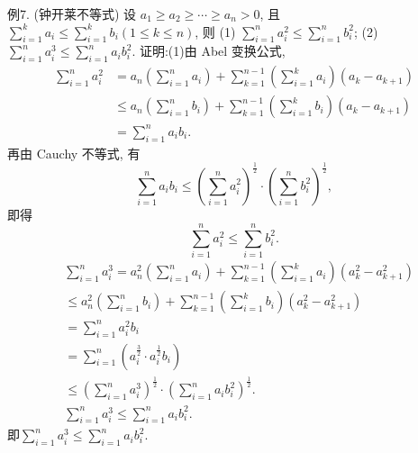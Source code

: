 例7. (钟开莱不等式) 设 $a_1 \geqslant a_2 \geqslant \cdots \geqslant a_n>0$, 且 $\sum_{i=1}^k a_i \leqslant \sum_{i=1}^k b_i(1 \leqslant k \leqslant n)$, 则
(1) $\sum_{i=1}^n a_i^2 \leqslant \sum_{i=1}^n b_i^2$;
(2) $\sum_{i=1}^n a_i^3 \leqslant \sum_{i=1}^n a_i b_i^2$.
证明:(1)由 Abel 变换公式,
$$
\begin{aligned}
\sum_{i=1}^n a_i^2 & =a_n\left(\sum_{i=1}^n a_i\right)+\sum_{k=1}^{n-1}\left(\sum_{i=1}^k a_i\right)\left(a_k-a_{k+1}\right) \\
& \leqslant a_n\left(\sum_{i=1}^n b_i\right)+\sum_{k=1}^{n-1}\left(\sum_{i=1}^k b_i\right)\left(a_k-a_{k+1}\right) \\
& =\sum_{i=1}^n a_i b_i .
\end{aligned}
$$
再由 Cauchy 不等式, 有
$$
\sum_{i=1}^n a_i b_i \leqslant\left(\sum_{i=1}^n a_i^2\right)^{\frac{1}{2}} \cdot\left(\sum_{i=1}^n b_i^2\right)^{\frac{1}{2}},
$$
即得
$$
\sum_{i=1}^n a_i^2 \leqslant \sum_{i=1}^n b_i^2 .
$$
$$
\begin{aligned}
& \sum_{i=1}^n a_i^3=a_n^2\left(\sum_{i=1}^n a_i\right)+\sum_{k=1}^{n-1}\left(\sum_{i=1}^k a_i\right)\left(a_k^2-a_{k+1}^2\right) \\
& \leqslant a_n^2\left(\sum_{i=1}^n b_i\right)+\sum_{k=1}^{n-1}\left(\sum_{i=1}^k b_i\right)\left(a_k^2-a_{k+1}^2\right) \\
&=\sum_{i=1}^n a_i^2 b_i \\
&=\sum_{i=1}^n\left(a_i^{\frac{3}{2}} \cdot a_i^{\frac{1}{2}} b_i\right) \\
& \leqslant\left(\sum_{i=1}^n a_i^3\right)^{\frac{1}{2}} \cdot\left(\sum_{i=1}^n a_i b_i^2\right)^{\frac{1}{2}} . \\
& \sum_{i=1}^n a_i^3 \leqslant \sum_{i=1}^n a_i b_i^2 .
\end{aligned}
$$
即$\sum_{i=1}^n a_i^3 \leqslant \sum_{i=1}^n a_i b_i^2$.



